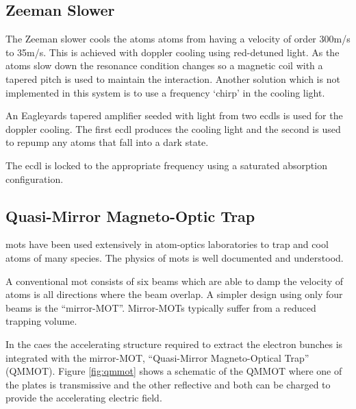 \subsection{Zeeman Slower}
The Zeeman slower cools the atoms atoms from having a velocity of order 300m/s to 35m/s. This is achieved with doppler cooling using red-detuned light. As the atoms slow down the resonance condition changes so a magnetic coil with a tapered pitch is used to maintain the interaction. Another solution which is not implemented in this system is to use a frequency `chirp' in the cooling light.

An Eagleyards tapered amplifier seeded with light from two \glspl{ecdl} is used for the doppler cooling. The first \gls{ecdl} produces the cooling light and the second is used to repump any atoms that fall into a dark state.

The \gls{ecdl} is locked to the appropriate frequency using a saturated absorption configuration\cite{maguire_theoretical_2006,haroche_theory_1972, preston_doppler-free_1996}.

\subsection{Quasi-Mirror Magneto-Optic Trap}
\glspl{mot} have been used extensively in atom-optics laboratories to trap and cool atoms of many species. The physics of \glspl{mot} is well documented and understood\cite{metcalf_laser_1999}.

A conventional \gls{mot} consists of six beams which are able to damp the velocity of atoms is all directions where the beam overlap. A simpler design using only four beams is the ``mirror-MOT''. Mirror-MOTs typically suffer from a reduced trapping volume\cite{reichel_atomic_1999}.

In the \gls{caes} the accelerating structure required to extract the electron bunches is integrated with the mirror-MOT, ``Quasi-Mirror Magneto-Optical Trap'' (QMMOT)\cite{hanssen_using_2006}. Figure \ref{fig:qmmot} shows a schematic of the QMMOT where one of the plates is transmissive and the other reflective and both can be charged to provide the accelerating electric field.

